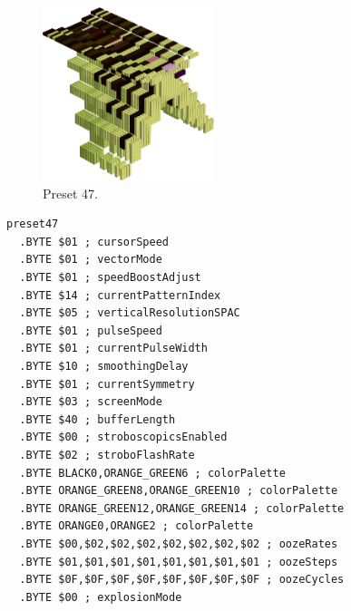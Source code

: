 \vspace*{-0.5cm}
\begin{minipage}[b]{0.48\linewidth}
\begin{figure}[H]                                                          
  \centering                                                             
  \begin{adjustbox}{width=5cm,center}                                   
  \includegraphics[width=5cm]{src/colorspace_presets/preset47-45.png}%
  \end{adjustbox}                                                        
\caption*{Preset 47.}                                           
\end{figure}                                                               
\end{minipage}
\hspace{0.1cm}
\begin{minipage}[b]{0.48\linewidth}                                                                         
\begin{lstlisting}[basicstyle=\ttfamily\tiny]
preset47
  .BYTE $01 ; cursorSpeed
  .BYTE $01 ; vectorMode
  .BYTE $01 ; speedBoostAdjust
  .BYTE $14 ; currentPatternIndex
  .BYTE $05 ; verticalResolutionSPAC
  .BYTE $01 ; pulseSpeed
  .BYTE $01 ; currentPulseWidth
  .BYTE $10 ; smoothingDelay
  .BYTE $01 ; currentSymmetry
  .BYTE $03 ; screenMode
  .BYTE $40 ; bufferLength
  .BYTE $00 ; stroboscopicsEnabled
  .BYTE $02 ; stroboFlashRate
  .BYTE BLACK0,ORANGE_GREEN6 ; colorPalette
  .BYTE ORANGE_GREEN8,ORANGE_GREEN10 ; colorPalette
  .BYTE ORANGE_GREEN12,ORANGE_GREEN14 ; colorPalette
  .BYTE ORANGE0,ORANGE2 ; colorPalette
  .BYTE $00,$02,$02,$02,$02,$02,$02,$02 ; oozeRates
  .BYTE $01,$01,$01,$01,$01,$01,$01,$01 ; oozeSteps
  .BYTE $0F,$0F,$0F,$0F,$0F,$0F,$0F,$0F ; oozeCycles
  .BYTE $00 ; explosionMode
\end{lstlisting}
\end{minipage}


